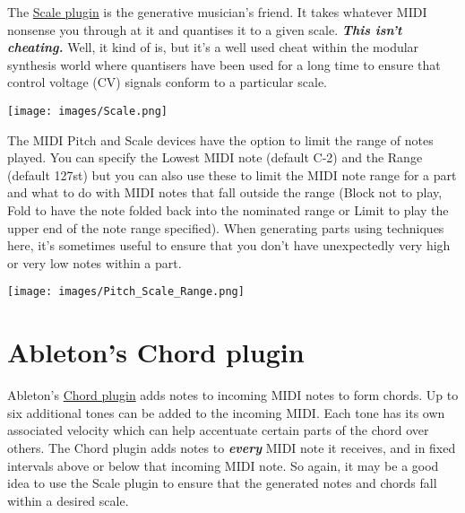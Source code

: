 \documentclass[
  12pt,
  letterpaper,
  oneside,
  open=any]{scrbook}
\begin{document}
The
\href{https://www.ableton.com/en/live-manual/11/live-midi-effect-reference/\#scale}{Scale
plugin} is the generative musician's friend. It takes whatever MIDI
nonsense you through at it and quantises it to a given scale.
\textbf{\emph{This isn't cheating.}} Well, it kind of is, but it's a
well used cheat within the modular synthesis world where quantisers have
been used for a long time to ensure that control voltage (CV) signals
conform to a particular scale.

\texttt{[image: images/Scale.png]}

\begin{tcolorbox}[enhanced jigsaw, arc=.35mm, title=\textcolor{quarto-callout-tip-color}{\faLightbulb}\hspace{0.5em}{Note Range}, colback=white, opacitybacktitle=0.6, coltitle=black, toptitle=1mm, colframe=quarto-callout-tip-color-frame, bottomtitle=1mm, titlerule=0mm, rightrule=.15mm, bottomrule=.15mm, colbacktitle=quarto-callout-tip-color!10!white, toprule=.15mm, breakable, opacityback=0, left=2mm, leftrule=.75mm]

The MIDI Pitch and Scale devices have the option to limit the range of
notes played. You can specify the Lowest MIDI note (default C-2) and the
Range (default 127st) but you can also use these to limit the MIDI note
range for a part and what to do with MIDI notes that fall outside the
range (Block not to play, Fold to have the note folded back into the
nominated range or Limit to play the upper end of the note range
specified). When generating parts using techniques here, it's sometimes
useful to ensure that you don't have unexpectedly very high or very low
notes within a part.

\end{tcolorbox}

\texttt{[image: images/Pitch\_Scale\_Range.png]}

\section{Ableton's Chord plugin}\label{abletons-chord-plugin}

Ableton's
\href{https://www.ableton.com/en/live-manual/11/live-midi-effect-reference/\#chord}{Chord
plugin} adds notes to incoming MIDI notes to form chords. Up to six
additional tones can be added to the incoming MIDI. Each tone has its
own associated velocity which can help accentuate certain parts of the
chord over others. The Chord plugin adds notes to \textbf{\emph{every}}
MIDI note it receives, and in fixed intervals above or below that
incoming MIDI note. So again, it may be a good idea to use the Scale
plugin to ensure that the generated notes and chords fall within a
desired scale.
\end{document}
